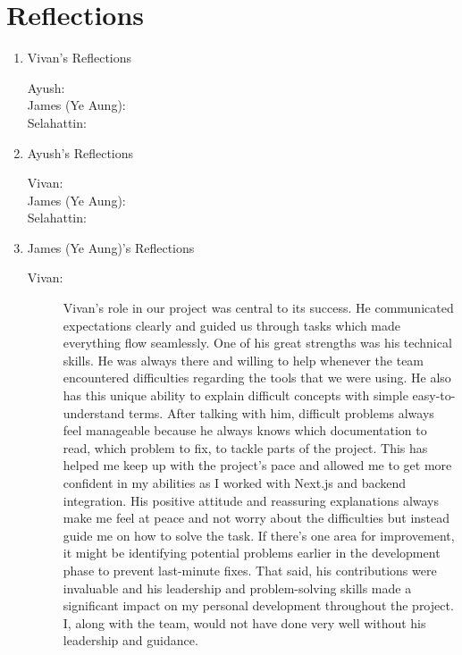 \documentclass[a4paper, 12pt]{article}
\begin{document}
\section*{Reflections}
\begin{enumerate}
    \item Vivan's Reflections
        \begin{description}
            \item[Ayush: ] %
            \item[James (Ye Aung): ] %
            \item[Selahattin: ] %
        \end{description}
    \item Ayush's Reflections
        \begin{description}
            \item[Vivan: ] %
            \item[James (Ye Aung): ] %
            \item[Selahattin: ] %
        \end{description}
    \item James (Ye Aung)'s Reflections
        \begin{description}
            \item[Vivan: ] Vivan’s role in our project was central to its success. He communicated expectations clearly and guided us through tasks which made everything flow seamlessly. One of his great strengths was his technical skills. He was always there and willing to help whenever the team encountered difficulties regarding the tools that we were using. He also has this unique ability to explain difficult concepts with simple easy-to-understand terms. After talking with him, difficult problems always feel manageable because he always knows which documentation to read, which problem to fix, to tackle parts of the project. This has helped me keep up with the project’s pace and allowed me to get more confident in my abilities as I worked with Next.js and backend integration. His positive attitude and reassuring explanations always make me feel at peace and not worry about the difficulties but instead guide me on how to solve the task. If there’s one area for improvement, it might be identifying potential problems earlier in the development phase to prevent last-minute fixes. That said, his contributions were invaluable and his leadership and problem-solving skills made a significant impact on my personal development throughout the project. I, along with the team, would not have done very well without his leadership and guidance.

\end{description}
\end{enumerate}
\end{document}
